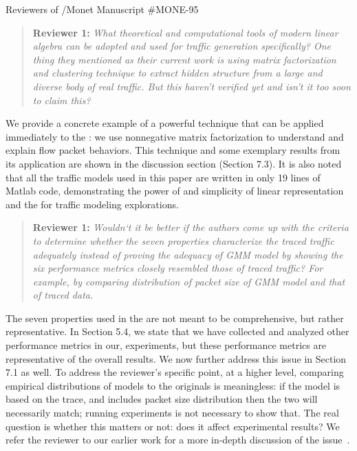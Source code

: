 \documentclass{letter}
\newenvironment{reviewer}[1]%
{\begin{quote}\textbf{Reviewer #1:} \it}{\end{quote}}
\begin{document}
\begin{letter}{Reviewers of /Monet Manuscript \#MONE-95}
\begin{reviewer}{1}
What theoretical and computational tools of modern linear algebra can be adopted and used for traffic generation specifically? One thing they mentioned as their current work is using matrix factorization and clustering technique to extract hidden structure from a large and diverse body of real traffic. But this haven’t verified yet and isn’t it too soon to claim this?
\end{reviewer}
We provide a concrete example of a powerful technique that can be applied immediately to the : we use nonnegative matrix factorization to understand and explain flow packet behaviors.
This technique and some exemplary results from its application are shown in the discussion section (Section 7.3).
It is also noted that all the traffic models used in this paper are written in only 19 lines of Matlab code, demonstrating the power of and simplicity of linear representation and the  for traffic modeling explorations.

\begin{reviewer}{1}
Wouldn‘t it be better if the authors come up with the criteria to determine whether the seven properties characterize the traced traffic adequately instead of proving the adequacy of GMM model by showing the six performance metrics closely resembled those of traced traffic? For example, by comparing distribution of packet size of GMM model and that of traced data.
\end{reviewer}
The seven properties used in the  are not meant to be comprehensive, but rather representative.
In Section 5.4, we state that we have collected and analyzed other performance metrics in our, experiments, but these performance metrics are representative of the overall results.
We now further address this issue in Section 7.1 as well.
To address the reviewer's specific point, at a higher level, comparing empirical distributions of models to the originals is meaningless:
if the model is based on the trace, and includes packet size distribution then the two will necessarily match;
running experiments is not necessary to show that.
The real question is whether this matters or not:
does it affect experimental results?
We refer the reviewer to our earlier work for a more in-depth discussion of the issue~\cite{Karpinski07:realism,Karpinski07:cbr-failure}.


\end{letter}
\end{document}
